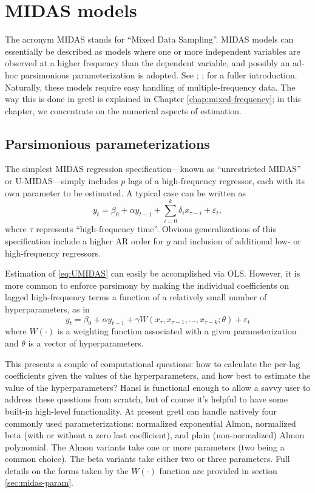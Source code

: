 \chapter{MIDAS models}
\label{chap:MIDAS}

The acronym MIDAS stands for ``Mixed Data Sampling''. MIDAS models can
essentially be described as models where one or more independent
variables are observed at a higher frequency than the dependent
variable, and possibly an ad-hoc parsimonious parameterization is
adopted. See \citealp{ghysels04}; \citealp{ghysels15};
\citealp{armesto10} for a fuller introduction. Naturally, these models
require easy handling of multiple-frequency data. The way this is done
in gretl is explained in Chapter \ref{chap:mixed-frequency}; in
this chapter, we concentrate on the numerical aspects of estimation.

\section{Parsimonious parameterizations}
\label{sec:hparams}

The simplest MIDAS regression specification---known as ``unrestricted
MIDAS'' or U-MIDAS---simply includes $p$ lags of a high-frequency
regressor, each with its own parameter to be estimated. A typical case
can be written as
\begin{equation}
  \label{eq:UMIDAS}
  y_t = \beta_0 + \alpha y_{t-1} + \sum_{i=0}^k \delta_i x_{\tau-i} + \varepsilon_t, 
\end{equation}
where $\tau$ represents ``high-frequency time''. Obvious
generalizations of this specification include a higher AR order for
$y$ and inclusion of additional low- or high-frequency regressors.

Estimation of \eqref{eq:UMIDAS} can easily be accomplished via
OLS. However, it is more common to enforce parsimony by making the
individual coefficients on lagged high-frequency terms a function of a
relatively small number of hyperparameters, as in
\begin{equation}
  \label{eq:MIDAS}
  y_t = \beta_0 + \alpha y_{t-1} + \gamma W(x_{\tau}, x_{\tau-1},\dots,
  x_{\tau-k}; \theta) + \varepsilon_t
\end{equation}
where $W(\cdot)$ is a weighting function associated with a given
parameterization and $\theta$ is a vector of hyperparameters.

This presents a couple of computational questions: how to calculate
the per-lag coefficients given the values of the hyperparameters, and
how best to estimate the value of the hyperparameters?  Hansl is
functional enough to allow a savvy user to address these questions
from scratch, but of course it's helpful to have some built-in
high-level functionality. At present gretl can handle natively four
commonly used parameterizations: normalized exponential Almon,
normalized beta (with or without a zero last coefficient), and plain
(non-normalized) Almon polynomial. The Almon variants take one or more
parameters (two being a common choice). The beta variants take either
two or three parameters. Full details on the forms taken by the
$W(\cdot)$ function are provided in section \ref{sec:midas-param}.


